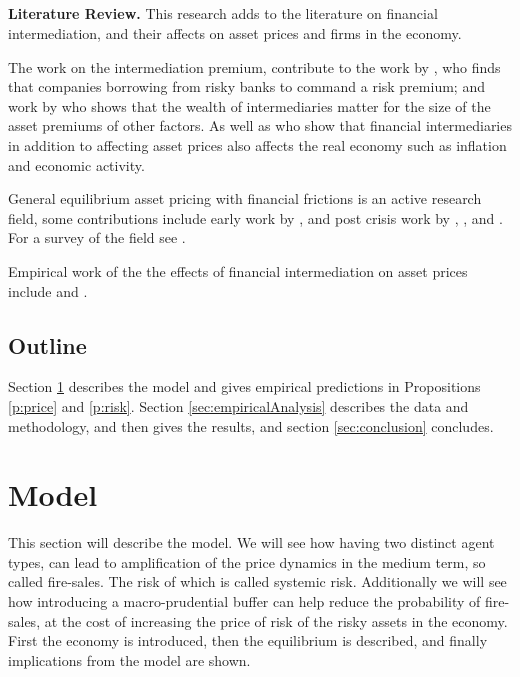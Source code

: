 \documentclass[11pt]{article}
\begin{document}
\subsection*{}
\vspace{-1.5cm}
\textbf{Literature Review.} 
This research adds to the literature on financial intermediation, and their affects on asset prices and firms in the economy.

The work on the intermediation premium, contribute to the work by \citet{Marchuk2017}, who finds that companies borrowing from risky banks to command a risk premium; and work by \citet{Adrian2014} who shows that the wealth of intermediaries matter for the size of the asset premiums of other factors. As well as \citet{Adrian2010} who show that financial intermediaries in addition to affecting asset prices also affects the real economy such as inflation and economic activity.

General equilibrium asset pricing with financial frictions is an active research field, some contributions include early work by \citet{Geanakoplos1997, geanakoplos2003}, and post crisis work by \citet{Brunnermeier2009}, \citet{He2013}, and \citet{Brunnermeier2014}. For a survey of the field see \citet{Brunnermeier2013}.

Empirical work of the the effects of financial intermediation on asset prices include \citet{Adrian2010,Adrian2014} and \citet{Marchuk2017}.

\subsection*{Outline}

Section \ref{sec:model} describes the model and gives empirical predictions in Propositions \ref{p:price} and \ref{p:risk}. Section \ref{sec:empiricalAnalysis} describes the data and methodology, and then gives %
the results, and section \ref{sec:conclusion} concludes.




\section{Model} \label{sec:model}

This section will describe the model. We will see how having two distinct agent types, can lead to amplification of the price dynamics in the medium term, so called fire-sales. The risk of which is called systemic risk. Additionally we will see how introducing a macro-prudential buffer can help reduce the probability of fire-sales, at the cost of increasing the price of risk of the risky assets in the economy. First the economy is introduced, then the equilibrium is described, and finally implications from the model are shown. 
\end{document}
